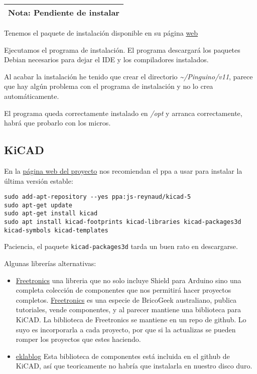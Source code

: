 \documentclass[
  12pt,
  spanish,
]{article}
\providecommand{\tightlist}{%
  \setlength{\itemsep}{0pt}\setlength{\parskip}{0pt}}
\begin{document}
\begin{longtable}[]{@{}l@{}}
\toprule
\endhead
\textbf{Nota}: Pendiente de instalar\tabularnewline
\bottomrule
\end{longtable}

Tenemos el paquete de instalación disponible en su página
\href{http://pinguino.cc/download.php}{web}

Ejecutamos el programa de instalación. El programa descargará los
paquetes Debian necesarios para dejar el IDE y los compiladores
instalados.

Al acabar la instalación he tenido que crear el directorio
\emph{\textasciitilde/Pinguino/v11}, parece que hay algún problema con
el programa de instalación y no lo crea automáticamente.

El programa queda correctamente instalado en \emph{/opt} y arranca
correctamente, habrá que probarlo con los micros.

\hypertarget{kicad}{%
\subsection{KiCAD}\label{kicad}}

En la \href{http://kicad-pcb.org/download/linux-mint/}{página web del
proyecto} nos recomiendan el ppa a usar para instalar la última versión
estable:

\begin{verbatim}
sudo add-apt-repository --yes ppa:js-reynaud/kicad-5
sudo apt-get update
sudo apt-get install kicad
sudo apt install kicad-footprints kicad-libraries kicad-packages3d kicad-symbols kicad-templates
\end{verbatim}

Paciencia, el paquete \texttt{kicad-packages3d} tarda un buen rato en
descargarse.

Algunas librerías alternativas:

\begin{itemize}
\tightlist
\item
  \href{https://github.com/freetronics/freetronics_kicad_library}{Freetronics}
  una libreria que no solo incluye Shield para Arduino sino una completa
  colección de componentes que nos permitirá hacer proyectos completos.
  \href{http://www.freetronics.com}{Freetronics} es una especie de
  BricoGeek australiano, publica tutoriales, vende componentes, y al
  parecer mantiene una biblioteca para KiCAD. La biblioteca de
  Freetronics se mantiene en un repo de github. Lo suyo es incorporarla
  a cada proyecto, por que si la actualizas se pueden romper los
  proyectos que estes haciendo.
\item
  \href{http://meta-blog.eklablog.com/kicad-librairie-arduino-pretty-p930786}{eklablog}
  Esta biblioteca de componentes está incluida en el github de KiCAD,
  así que teoricamente no habría que instalarla en nuestro disco duro.
\end{itemize}
\end{document}
